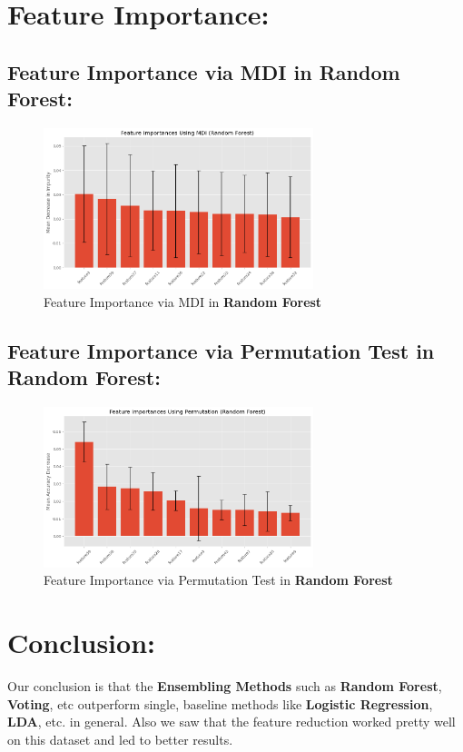 \documentclass[a4paper,12pt]{article}
\begin{document}
\section{Feature Importance:}
\subsection{Feature Importance via MDI in Random Forest:}
\begin{figure}[H]
    \centering
    \includegraphics[width=0.7\textwidth]{./images/feature_impor_mdi.png}
    \caption{Feature Importance via MDI in \textbf{Random Forest}}
    \label{fig:fig_33}
\end{figure}

\subsection{Feature Importance via Permutation Test in Random Forest:}
\begin{figure}[H]
    \centering
    \includegraphics[width=0.7\textwidth]{./images/feature_impor_perm.png}
    \caption{Feature Importance via Permutation Test in \textbf{Random Forest}}
    \label{fig:fig_34}
\end{figure}


\section{Conclusion:}
Our conclusion is that the \textbf{Ensembling Methods} such as \textbf{Random Forest}, \textbf{Voting}, etc outperform single, baseline methods like \textbf{Logistic Regression}, \textbf{LDA}, etc. in general. 
Also we saw that the feature reduction worked pretty well on this dataset and led to better results.   
\end{document}
